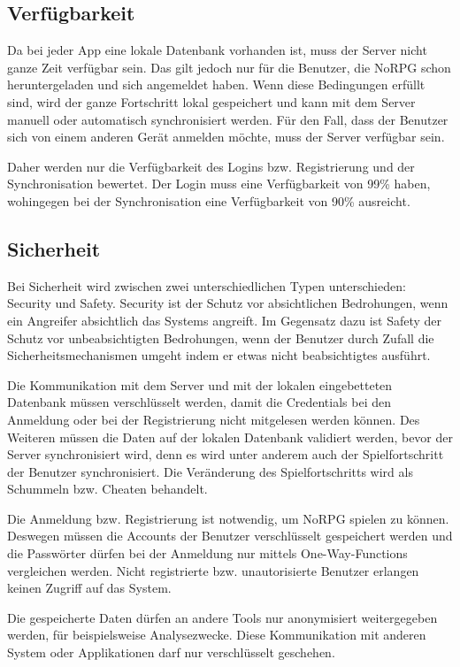 	\subsection{Verfügbarkeit}
		Da bei jeder App eine lokale Datenbank vorhanden ist, muss der Server nicht ganze Zeit verfügbar sein. Das gilt jedoch nur für die Benutzer, die NoRPG schon heruntergeladen und sich angemeldet haben. Wenn diese Bedingungen erfüllt sind, wird der ganze Fortschritt lokal gespeichert und kann mit dem Server manuell oder automatisch synchronisiert werden. Für den Fall, dass der Benutzer sich von einem anderen Gerät anmelden möchte, muss der Server verfügbar sein.
		
		Daher werden nur die Verfügbarkeit des Logins bzw. Registrierung und der Synchronisation bewertet. Der Login muss eine Verfügbarkeit von 99\% haben, wohingegen bei der Synchronisation eine Verfügbarkeit von 90\% ausreicht.
		
	\subsection{Sicherheit}
		Bei Sicherheit wird zwischen zwei unterschiedlichen Typen unterschieden: Security und Safety. Security ist der Schutz vor absichtlichen Bedrohungen, wenn ein Angreifer absichtlich das Systems angreift. Im Gegensatz dazu ist Safety der Schutz vor unbeabsichtigten Bedrohungen, wenn der Benutzer durch Zufall die Sicherheitsmechanismen umgeht indem er etwas nicht beabsichtigtes ausführt.
		
		Die Kommunikation mit dem Server und mit der lokalen eingebetteten Datenbank müssen verschlüsselt werden, damit die Credentials bei den Anmeldung oder bei der Registrierung nicht mitgelesen werden können. Des Weiteren müssen die Daten auf der lokalen Datenbank validiert werden, bevor der Server synchronisiert wird, denn es wird unter anderem auch der Spielfortschritt der Benutzer synchronisiert. Die Veränderung des Spielfortschritts wird als Schummeln bzw. Cheaten behandelt.
		
		Die Anmeldung bzw. Registrierung ist notwendig, um NoRPG spielen zu können. Deswegen müssen die Accounts der Benutzer verschlüsselt gespeichert werden und die Passwörter dürfen bei der Anmeldung nur mittels One-Way-Functions vergleichen werden. Nicht registrierte bzw. unautorisierte Benutzer erlangen keinen Zugriff auf das System.
		
		Die gespeicherte Daten dürfen an andere Tools nur anonymisiert weitergegeben werden, für beispielsweise Analysezwecke. Diese Kommunikation mit anderen System oder Applikationen darf nur verschlüsselt geschehen.
		
